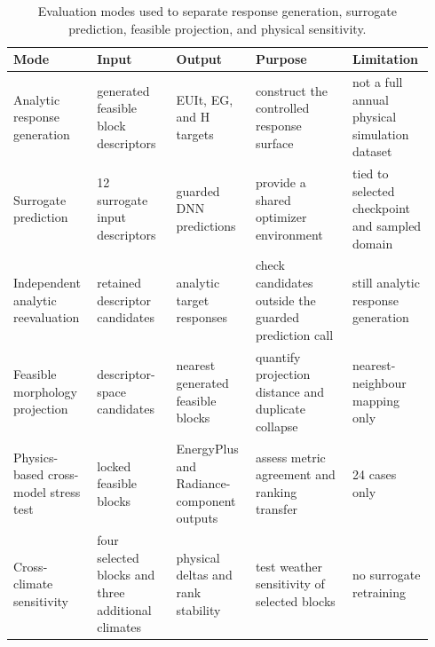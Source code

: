 \begin{table}[H]
\begin{revblock}
\caption{Evaluation modes used to separate response generation, surrogate prediction, feasible projection, and physical sensitivity.}
\label{tab:evaluation-modes}
\centering
\scriptsize
\begin{threeparttable}
\begin{tabularx}{\linewidth}{@{}p{0.19\linewidth}p{0.18\linewidth}p{0.18\linewidth}p{0.22\linewidth}p{0.17\linewidth}@{}}
\toprule
Mode & Input & Output & Purpose & Limitation \\
\midrule
Analytic response generation & generated feasible block descriptors & EUIt, EG, and H targets & construct the controlled response surface & not a full annual physical simulation dataset \\
Surrogate prediction & 12 surrogate input descriptors & guarded DNN predictions & provide a shared optimizer environment & tied to selected checkpoint and sampled domain \\
Independent analytic reevaluation & retained descriptor candidates & analytic target responses & check candidates outside the guarded prediction call & still analytic response generation \\
Feasible morphology projection & descriptor-space candidates & nearest generated feasible blocks & quantify projection distance and duplicate collapse & nearest-neighbour mapping only \\
Physics-based cross-model stress test & locked feasible blocks & EnergyPlus and Radiance-component outputs & assess metric agreement and ranking transfer & 24 cases only \\
Cross-climate sensitivity & four selected blocks and three additional climates & physical deltas and rank stability & test weather sensitivity of selected blocks & no surrogate retraining \\
\bottomrule
\end{tabularx}
\end{threeparttable}
\end{revblock}
\end{table}

\subsection{}


